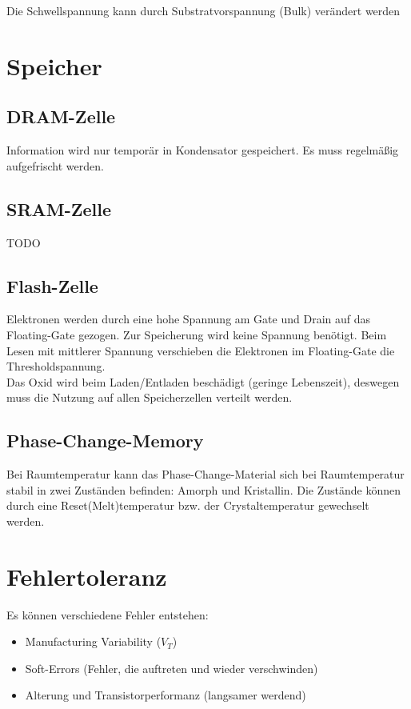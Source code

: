 \documentclass[english]{latex4ei/latex4ei_sheet}
\begin{document}
Die Schwellspannung kann durch Substratvorspannung (Bulk) verändert werden

\section{Speicher}
\subsection{DRAM-Zelle}
Information wird nur temporär in Kondensator gespeichert. Es muss regelmäßig aufgefrischt werden.
\subsection{SRAM-Zelle}
TODO
\subsection{Flash-Zelle}
Elektronen werden durch eine hohe Spannung am Gate und Drain auf das Floating-Gate gezogen. Zur Speicherung wird keine Spannung benötigt. Beim Lesen mit mittlerer Spannung verschieben die Elektronen im Floating-Gate die Thresholdspannung.\\
Das Oxid wird beim Laden/Entladen beschädigt (geringe Lebenszeit), deswegen muss die Nutzung auf allen Speicherzellen verteilt werden.
\subsection{Phase-Change-Memory}
Bei Raumtemperatur kann das Phase-Change-Material sich bei Raumtemperatur stabil in zwei Zuständen befinden: Amorph und Kristallin. Die Zustände können durch eine Reset(Melt)temperatur bzw. der Crystaltemperatur gewechselt werden. 


\section{Fehlertoleranz}
Es können verschiedene Fehler entstehen:
\begin{itemize}
	\item Manufacturing Variability ($V_T$)
	\item Soft-Errors (Fehler, die auftreten und wieder verschwinden)
	\item Alterung und Transistorperformanz (langsamer werdend)
\end{itemize}
\end{document}
